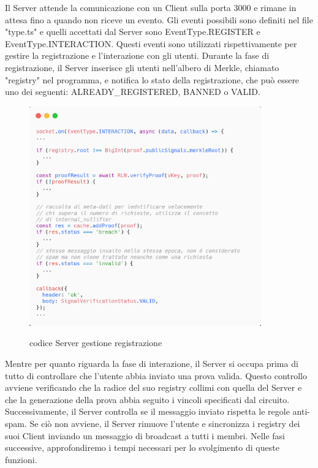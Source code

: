 Il Server attende la comunicazione con un Client sulla porta 3000 e rimane in attesa fino a quando non riceve un evento. Gli eventi possibili sono definiti nel file "type.ts" e quelli accettati dal Server sono EventType.REGISTER e EventType.INTERACTION. Questi eventi sono utilizzati rispettivamente per gestire la registrazione e l'interazione con gli utenti. Durante la fase di registrazione, il Server inserisce gli utenti nell'albero di Merkle, chiamato "registry" nel programma, e notifica lo stato della registrazione, che può essere uno dei seguenti: ALREADY\_REGISTERED, BANNED o VALID. 
\begin{figure}[H]
    \centering
    \includegraphics[width=10cm]{./chapters/3.poc/images/3.1.Server.png}
    \label{fig:1.Server}
    \captionsetup{justification=centering}
    \caption{codice Server gestione registrazione}
\end{figure}
Mentre per quanto riguarda la fase di interazione, il Server si occupa prima di tutto di controllare che l'utente abbia inviato una prova valida. Questo controllo avviene verificando che la radice del suo registry collimi con quella del Server e che la generazione della prova abbia seguito i vincoli specificati dal circuito. Successivamente, il Server controlla se il messaggio inviato rispetta le regole anti-spam. Se ciò non avviene, il Server rimuove l'utente e sincronizza i registry dei suoi Client inviando un messaggio di broadcast a tutti i membri. Nelle fasi successive, approfondiremo i tempi necessari per lo svolgimento di queste funzioni.
